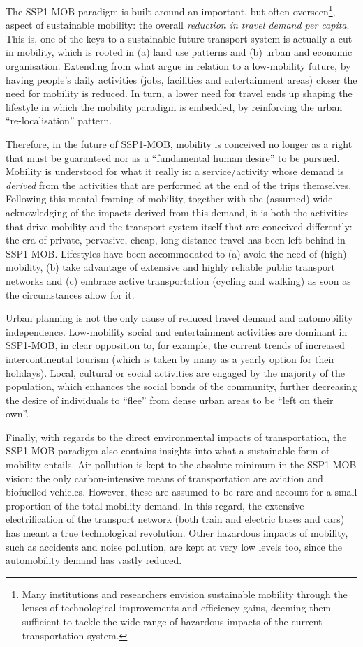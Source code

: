 The SSP1-MOB paradigm is built around an important, but often overseen\footnote{Many institutions and researchers envision sustainable mobility through the lenses of technological improvements and efficiency gains, deeming them sufficient to tackle the wide range of hazardous impacts of the current transportation system.}, aspect of sustainable mobility: the overall \emph{reduction in travel demand per capita}. This is, one of the keys to a sustainable future transport system is actually a cut in mobility, which is rooted in (a) land use patterns and (b) urban and economic organisation. Extending from what \textcite{moriarty2008_Lowmobilityfuture} argue in relation to a low-mobility future, by having people's daily activities (jobs, facilities and entertainment areas) closer the need for mobility is reduced. In turn, a lower need for travel ends up shaping the lifestyle in which the mobility paradigm is embedded, by reinforcing the urban ``re-localisation'' pattern.

Therefore, in the future of SSP1-MOB, mobility is conceived no longer as a right that must be guaranteed nor as a ``fundamental human desire'' to be pursued. Mobility is understood for what it really is: a service/activity whose demand is \emph{derived} from the activities that are performed at the end of the trips themselves. Following this mental framing of mobility, together with the (assumed) wide acknowledging of the impacts derived from this demand, it is both the activities that drive mobility and the transport system itself that are conceived differently: the era of private, pervasive, cheap, long-distance travel has been left behind in SSP1-MOB. Lifestyles have been accommodated to (a) avoid the need of (high) mobility, (b) take advantage of extensive and highly reliable public transport networks and (c) embrace active transportation (cycling and walking) as soon as the circumstances allow for it.

Urban planning is not the only cause of reduced travel demand and automobility independence. Low-mobility social and entertainment activities are dominant in SSP1-MOB, in clear opposition to, for example, the current trends of increased intercontinental tourism (which is taken by many as a yearly option for their holidays). Local, cultural or social activities are engaged by the majority of the population, which enhances the social bonds of the community, further decreasing the desire of individuals to ``flee'' from dense urban areas to be ``left on their own''.

Finally, with regards to the direct environmental impacts of transportation, the SSP1-MOB paradigm also contains insights into what a sustainable form of mobility entails. Air pollution is kept to the absolute minimum in the SSP1-MOB vision: the only carbon-intensive means of transportation are aviation and biofuelled vehicles. However, these are assumed to be rare and account for a small proportion of the total mobility demand. In this regard, the extensive electrification of the transport network (both train and electric buses and cars) has meant a true technological revolution. Other hazardous impacts of mobility, such as accidents and noise pollution, are kept at very low levels too, since the automobility demand has vastly reduced.